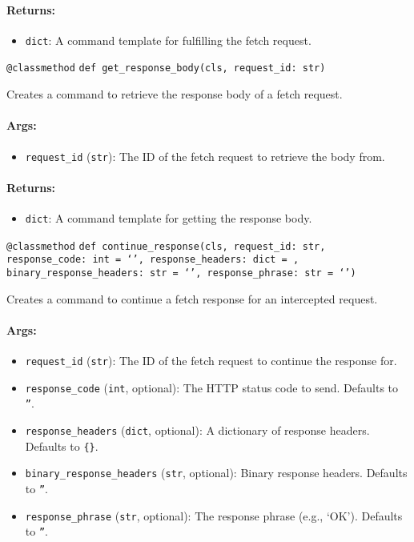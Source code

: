 \documentclass{article}
\begin{document}
\paragraph{Returns:}
\begin{itemize}
    \item \texttt{dict}: A command template for fulfilling the fetch request.
\end{itemize}

\noindent\texttt{@classmethod}
\noindent\texttt{def get\_response\_body(cls, request\_id: str)}

\noindent Creates a command to retrieve the response body of a fetch request.

\paragraph{Args:}
\begin{itemize}
    \item \texttt{request\_id} (\texttt{str}): The ID of the fetch request to retrieve the body from.
\end{itemize}

\paragraph{Returns:}
\begin{itemize}
    \item \texttt{dict}: A command template for getting the response body.
\end{itemize}

\noindent\texttt{@classmethod}
\noindent\texttt{def continue\_response(cls, request\_id: str, response\_code: int = `', response\_headers: dict = {}, binary\_response\_headers: str = `', response\_phrase: str = `')}

\noindent Creates a command to continue a fetch response for an intercepted request.

\paragraph{Args:}
\begin{itemize}
    \item \texttt{request\_id} (\texttt{str}): The ID of the fetch request to continue the response for.
    \item \texttt{response\_code} (\texttt{int}, optional): The HTTP status code to send. Defaults to \texttt{''}.
    \item \texttt{response\_headers} (\texttt{dict}, optional): A dictionary of response headers. Defaults to \texttt{\{\}}.
    \item \texttt{binary\_response\_headers} (\texttt{str}, optional): Binary response headers. Defaults to \texttt{''}.
    \item \texttt{response\_phrase} (\texttt{str}, optional): The response phrase (e.g., `OK'). Defaults to \texttt{''}.
\end{itemize}
\end{document}
